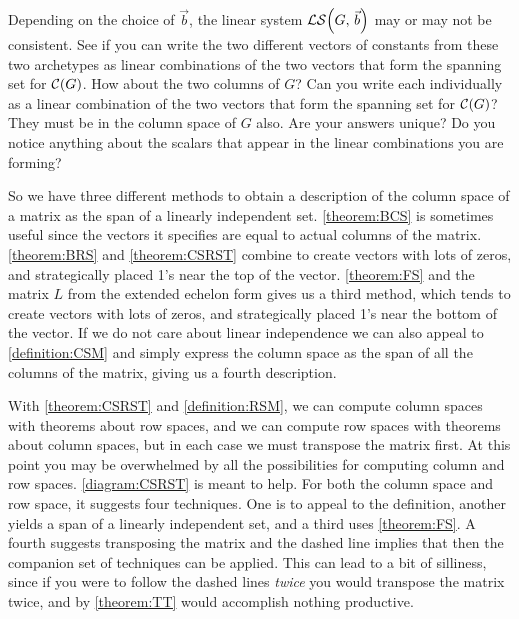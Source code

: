 \documentclass{ximera}
\begin{document}
\begin{example}
  Depending on the choice of $\vec{b}$, the linear system
  $\mathcal{LS}\!\left(G,\,\vec{b}\right)$ may or may not be consistent.  See if
  you can write the two different vectors of constants from these two
  archetypes as linear combinations of the two vectors that form the
  spanning set for $\mathcal{C}\!\left(G\right)$.  How about the two columns of $G$?  Can
  you write each individually as a linear combination of the two
  vectors that form the spanning set for $\mathcal{C}\!\left(G\right)$?  They must be in
  the column space of $G$ also.  Are your answers unique?  Do you
  notice anything about the scalars that appear in the linear
  combinations you are forming?
\end{example}

So we have three different methods to obtain a description of the
column space of a matrix as the span of a linearly independent set.
\ref{theorem:BCS} is sometimes useful since the vectors it specifies
are equal to actual columns of the matrix. \ref{theorem:BRS} and
\ref{theorem:CSRST} combine to create vectors with lots of zeros, and
strategically placed 1's near the top of the vector.  \ref{theorem:FS}
and the matrix $L$ from the extended echelon form gives us a third
method, which tends to create vectors with lots of zeros, and
strategically placed 1's near the bottom of the vector.  If we do not
care about linear independence we can also appeal to
\ref{definition:CSM} and simply express the column space as the span
of all the columns of the matrix, giving us a fourth description.


With \ref{theorem:CSRST} and \ref{definition:RSM}, we can compute
column spaces with theorems about row spaces, and we can compute row
spaces with theorems about column spaces, but in each case we must
transpose the matrix first.  At this point you may be overwhelmed by
all the possibilities for computing column and row spaces.
\ref{diagram:CSRST} is meant to help.  For both the column space and
row space, it suggests four techniques.  One is to appeal to the
definition, another yields a span of a linearly independent set, and a
third uses \ref{theorem:FS}.  A fourth suggests transposing the matrix
and the dashed line implies that then the companion set of techniques
can be applied.  This can lead to a bit of silliness, since if you
were to follow the dashed lines \textit{twice} you would transpose the
matrix twice, and by \ref{theorem:TT} would accomplish nothing
productive.
\end{document}
